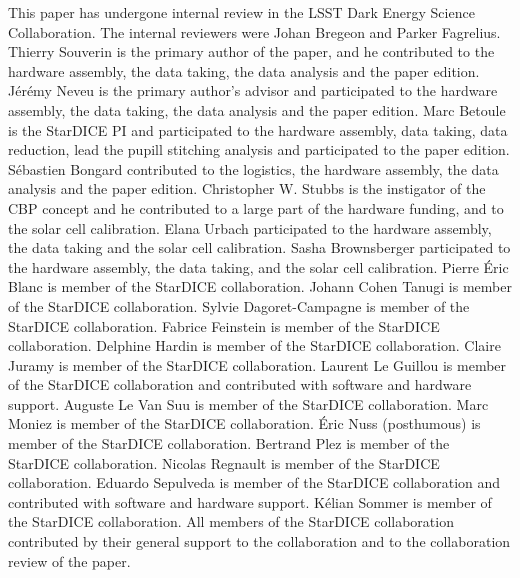 This paper has undergone internal review in the LSST Dark Energy Science Collaboration. The internal reviewers were Johan Bregeon and Parker Fagrelius.\\

Thierry Souverin is the primary author of the paper, and he contributed to the hardware assembly, the data taking, the data analysis and the paper edition. Jérémy Neveu is the primary author's advisor and participated to the hardware assembly, the data taking, the data analysis and the paper edition.  Marc Betoule is the StarDICE PI and participated to the hardware assembly, data taking, data reduction, lead the pupill stitching analysis and participated to the paper edition. Sébastien Bongard contributed to the logistics, the hardware assembly, the data analysis and the paper edition.  Christopher W. Stubbs is the instigator of the CBP concept and he contributed to a large part of the hardware funding, and to the solar cell calibration. Elana Urbach participated to the hardware assembly, the data taking and the solar cell calibration. 
Sasha Brownsberger participated to the hardware assembly, the data taking, and the solar cell calibration. Pierre Éric Blanc is member of the StarDICE collaboration. Johann Cohen Tanugi is member of the StarDICE collaboration. Sylvie Dagoret-Campagne is member of the StarDICE collaboration. Fabrice Feinstein is member of the StarDICE collaboration. Delphine Hardin is member of the StarDICE collaboration. Claire Juramy is member of the StarDICE collaboration. Laurent Le Guillou is member of the StarDICE collaboration and contributed with software and hardware support. Auguste Le Van Suu is member of the StarDICE collaboration. Marc Moniez is member of the StarDICE collaboration. Éric Nuss (posthumous) is member of the StarDICE collaboration. Bertrand
Plez is member of the StarDICE collaboration. Nicolas Regnault is member of the StarDICE collaboration. Eduardo Sepulveda is member of the StarDICE collaboration and contributed with software and hardware support. Kélian Sommer is member of the StarDICE collaboration. All members of the StarDICE collaboration contributed by their general support to the collaboration and to the collaboration review of the paper.

